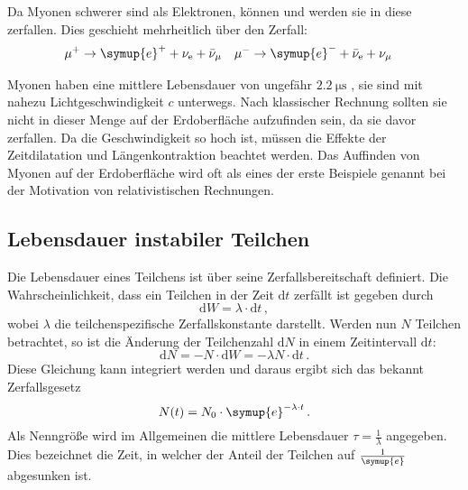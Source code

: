        \noindent Da Myonen schwerer sind als Elektronen, können und werden sie in diese zerfallen. Dies geschieht mehrheitlich über den Zerfall:
        \begin{align*}
            \mu^+ &\rightarrow \symup{e}^+ + \nu_{\text{e}} + \bar{\nu}_{\mu}   & \mu^- &\rightarrow \symup{e}^- + \bar{\nu}_\text{e} + \nu_{\mu} 
        \end{align*}

        \noindent Myonen haben eine mittlere Lebensdauer von ungefähr $\SI{2.2}{\micro\second}$ \cite{pdg}, sie sind mit nahezu Lichtgeschwindigkeit $c$ unterwegs. Nach klassischer Rechnung sollten 
        sie nicht in dieser Menge auf der Erdoberfläche aufzufinden sein, da sie davor zerfallen. Da die Geschwindigkeit so hoch ist, müssen die Effekte der Zeitdilatation und Längenkontraktion
        beachtet werden. Das Auffinden von Myonen auf der Erdoberfläche wird oft als eines der erste Beispiele genannt bei der Motivation von relativistischen Rechnungen. 

    \subsection{Lebensdauer instabiler Teilchen}

        \noindent Die Lebensdauer eines Teilchens ist über seine Zerfallsbereitschaft definiert. Die Wahrscheinlichkeit, dass ein Teilchen in der Zeit $\text{d}t$ zerfällt ist gegeben 
        durch 
        \begin{equation*}
            \text{d}W = \lambda \cdot \text{d}t \, ,
        \end{equation*}
        wobei $\lambda$ die teilchenspezifische Zerfallskonstante darstellt. Werden nun $N$ Teilchen betrachtet, so ist die Änderung der Teilchenzahl $\text{d}N$ in einem  
        Zeitintervall $\text{d} t$:
        \begin{equation*}
            \text{d} N = -N \cdot \text{d} W = - \lambda  N \cdot \text{d}t \, .
        \end{equation*}
        Diese Gleichung kann integriert werden und daraus ergibt sich das bekannt Zerfallsgesetz 
        \begin{equation*}
            N(t) = N_0 \cdot \symup{e}^{- \lambda \cdot t}\, .
        \end{equation*}
        Als Nenngröße wird im Allgemeinen die mittlere Lebensdauer $\tau = \frac{1}{\lambda}$ angegeben. Dies bezeichnet die Zeit, in welcher der Anteil der Teilchen auf $\frac{1}{\symup{e}}$
        abgesunken ist. 

